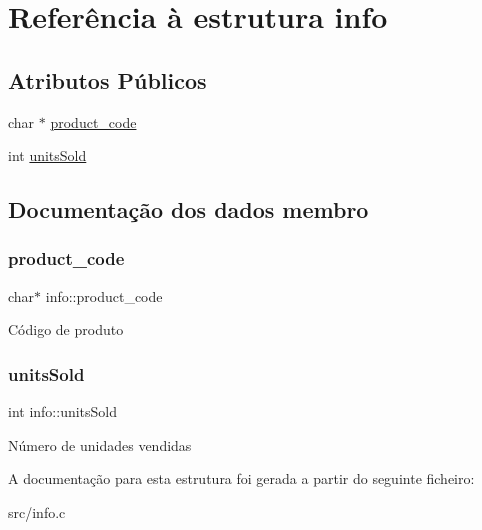 \hypertarget{structinfo}{}\section{Referência à estrutura info}
\label{structinfo}
\subsection*{Atributos Públicos}
\begin{DoxyCompactItemize}
\item 
char $\ast$ \hyperlink{structinfo_afb908eaad7e658245385c74a08ef0c25}{product\+\_\+code}
\item 
int \hyperlink{structinfo_a6eccfac56a466fce7c6b02eb375049a4}{units\+Sold}
\end{DoxyCompactItemize}


\subsection{Documentação dos dados membro}
\mbox{\label{structinfo_afb908eaad7e658245385c74a08ef0c25}} 
\subsubsection{\texorpdfstring{product\+\_\+code}{product\_code}}
{\footnotesize\ttfamily char$\ast$ info\+::product\+\_\+code}

Código de produto \mbox{\label{structinfo_a6eccfac56a466fce7c6b02eb375049a4}} 
\subsubsection{\texorpdfstring{units\+Sold}{unitsSold}}
{\footnotesize\ttfamily int info\+::units\+Sold}

Número de unidades vendidas 

A documentação para esta estrutura foi gerada a partir do seguinte ficheiro\+:\begin{DoxyCompactItemize}
\item 
src/info.\+c\end{DoxyCompactItemize}
